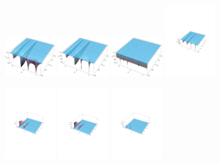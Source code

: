  
\begin{figure}[h!]
\center
\begin{minipage}{1.22\textwidth}
\begin{flushleft}
\includegraphics[width=0.20\textwidth,height=0.15\textwidth]{plot3}
\includegraphics[width=0.20\textwidth,height=0.15\textwidth]{plot4}
\includegraphics[width=0.20\textwidth,height=0.15\textwidth]{plot1}
\includegraphics[width=0.20\textwidth,height=0.15\textwidth]{plot2}
\end{flushleft}
\end{minipage}
\begin{minipage}{1.22\textwidth}
\begin{flushleft}
\includegraphics[width=0.20\textwidth,height=0.15\textwidth]{plot7}
\includegraphics[width=0.20\textwidth,height=0.15\textwidth]{plot8}
\includegraphics[width=0.20\textwidth,height=0.15\textwidth]{plot5}

\end{flushleft}
\end{minipage}
\end{figure}
